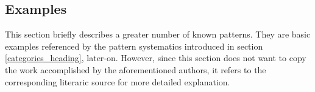 %
%
%
%
%
%
%

\subsection{Examples}
\label{examples_heading}

This section briefly describes a greater number of known patterns. They are
basic examples referenced by the pattern systematics introduced in section
\ref{categories_heading}, later-on. However, since this section does not want to
copy the work accomplished by the aforementioned authors, it refers to the
corresponding literaric source for more detailed explanation.




